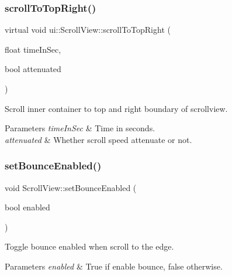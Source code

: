 \subsubsection{\texorpdfstring{scroll\+To\+Top\+Right()}{scrollToTopRight()}\hspace{0.1cm}{\footnotesize\ttfamily [2/2]}}
{\footnotesize\ttfamily virtual void ui\+::\+Scroll\+View\+::scroll\+To\+Top\+Right (\begin{DoxyParamCaption}\item[{float}]{time\+In\+Sec,  }\item[{bool}]{attenuated }\end{DoxyParamCaption})\hspace{0.3cm}{\ttfamily [virtual]}}

Scroll inner container to top and right boundary of scrollview. 
\begin{DoxyParams}{Parameters}
{\em time\+In\+Sec} & Time in seconds. \\
\hline
{\em attenuated} & Whether scroll speed attenuate or not. \\
\hline
\end{DoxyParams}
\mbox{\label{classui_1_1ScrollView_ae46c7b9ef733a28bd5da8384a2e0f161}} 
\subsubsection{\texorpdfstring{set\+Bounce\+Enabled()}{setBounceEnabled()}\hspace{0.1cm}{\footnotesize\ttfamily [1/2]}}
{\footnotesize\ttfamily void Scroll\+View\+::set\+Bounce\+Enabled (\begin{DoxyParamCaption}\item[{bool}]{enabled }\end{DoxyParamCaption})}



Toggle bounce enabled when scroll to the edge. 


\begin{DoxyParams}{Parameters}
{\em enabled} & True if enable bounce, false otherwise. \\
\hline
\end{DoxyParams}
\mbox{\label{classui_1_1ScrollView_a3f5c3723650d5e76b325b29b1a971afa}} 
